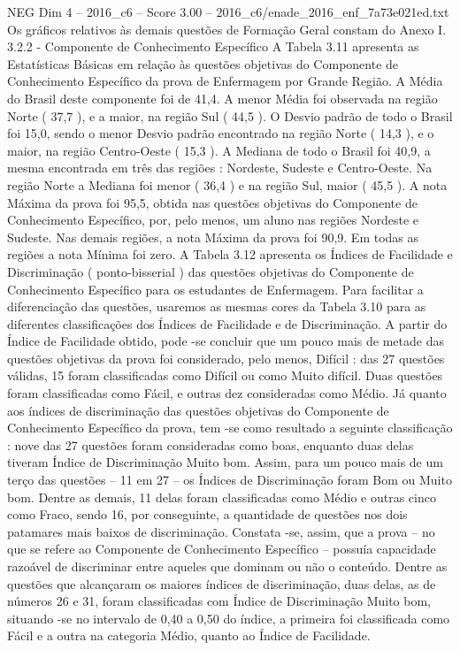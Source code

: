\begin{textsample}{NEG Dim 4 – 2016\_c6 – Score 3.00 – 2016\_c6/enade\_2016\_enf\_7a73e021ed.txt}
Os gráficos relativos às demais questões de Formação Geral constam do Anexo I. 3.2.2 - Componente de Conhecimento Específico A Tabela 3.11 apresenta as Estatísticas Básicas em relação às questões objetivas do Componente de Conhecimento Específico da prova de Enfermagem por Grande Região.
A Média do Brasil deste componente foi de 41,4.
A menor Média foi observada na região Norte ( 37,7 ), e a maior, na região Sul ( 44,5 ).
O Desvio padrão de todo o Brasil foi 15,0, sendo o menor Desvio padrão encontrado na região Norte ( 14,3 ), e o maior, na região Centro-Oeste ( 15,3 ).
A Mediana de todo o Brasil foi 40,9, a mesma encontrada em três das regiões : Nordeste, Sudeste e Centro-Oeste.
Na região Norte a Mediana foi menor ( 36,4 ) e na região Sul, maior ( 45,5 ).
A nota Máxima da prova foi 95,5, obtida nas questões objetivas do Componente de Conhecimento Específico, por, pelo menos, um aluno nas regiões Nordeste e Sudeste.
Nas demais regiões, a nota Máxima da prova foi 90,9.
Em todas as regiões a nota Mínima foi zero.
A Tabela 3.12 apresenta os Índices de Facilidade e Discriminação ( ponto-bisserial ) das questões objetivas do Componente de Conhecimento Específico para os estudantes de Enfermagem.
Para facilitar a diferenciação das questões, usaremos as mesmas cores da Tabela 3.10 para as diferentes classificações dos Índices de Facilidade e de Discriminação.
A partir do Índice de Facilidade obtido, pode -se concluir que um pouco mais de metade das questões objetivas da prova foi considerado, pelo menos, Difícil : das 27 questões válidas, 15 foram classificadas como Difícil ou como Muito difícil.
Duas questões foram classificadas como Fácil, e outras dez consideradas como Médio.
Já quanto aos índices de discriminação das questões objetivas do Componente de Conhecimento Específico da prova, tem -se como resultado a seguinte classificação : nove das 27 questões foram consideradas como boas, enquanto duas delas tiveram Índice de Discriminação Muito bom.
Assim, para um pouco mais de um terço das questões – 11 em 27 – os Índices de Discriminação foram Bom ou Muito bom.
Dentre as demais, 11 delas foram classificadas como Médio e outras cinco como Fraco, sendo 16, por conseguinte, a quantidade de questões nos dois patamares mais baixos de discriminação.
Constata -se, assim, que a prova – no que se refere ao Componente de Conhecimento Específico – possuía capacidade razoável de discriminar entre aqueles que dominam ou não o conteúdo.
Dentre as questões que alcançaram os maiores índices de discriminação, duas delas, as de números 26 e 31, foram classificadas com Índice de Discriminação Muito bom, situando -se no intervalo de 0,40 a 0,50 do índice, a primeira foi classificada como Fácil e a outra na categoria Médio, quanto ao Índice de Facilidade.

\end{textsample}
